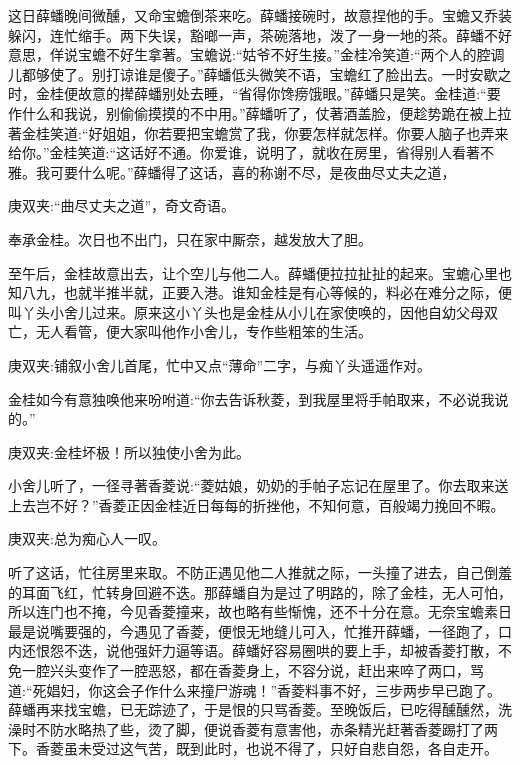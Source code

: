 \begin{parag}
    这日薛蟠晚间微醺，又命宝蟾倒茶来吃。薛蟠接碗时，故意捏他的手。宝蟾又乔装躲闪，连忙缩手。两下失误，豁啷一声，茶碗落地，泼了一身一地的茶。薛蟠不好意思，佯说宝蟾不好生拿著。宝蟾说:“姑爷不好生接。”金桂冷笑道:“两个人的腔调儿都够使了。别打谅谁是傻子。”薛蟠低头微笑不语，宝蟾红了脸出去。一时安歇之时，金桂便故意的撵薛蟠别处去睡，“省得你馋痨饿眼。”薛蟠只是笑。金桂道:“要作什么和我说，别偷偷摸摸的不中用。”薛蟠听了，仗著酒盖脸，便趁势跪在被上拉著金桂笑道:“好姐姐，你若要把宝蟾赏了我，你要怎样就怎样。你要人脑子也弄来给你。”金桂笑道:“这话好不通。你爱谁，说明了，就收在房里，省得别人看著不雅。我可要什么呢。”薛蟠得了这话，喜的称谢不尽，是夜曲尽丈夫之道，\begin{note}庚双夹:“曲尽丈夫之道”，奇文奇语。\end{note}奉承金桂。次日也不出门，只在家中厮奈，越发放大了胆。
\end{parag}


\begin{parag}
    至午后，金桂故意出去，让个空儿与他二人。薛蟠便拉拉扯扯的起来。宝蟾心里也知八九，也就半推半就，正要入港。谁知金桂是有心等候的，料必在难分之际，便叫丫头小舍儿过来。原来这小丫头也是金桂从小儿在家使唤的，因他自幼父母双亡，无人看管，便大家叫他作小舍儿，专作些粗笨的生活。\begin{note}庚双夹:铺叙小舍儿首尾，忙中又点“薄命”二字，与痴丫头遥遥作对。\end{note}金桂如今有意独唤他来吩咐道:“你去告诉秋菱，到我屋里将手帕取来，不必说我说的。”\begin{note}庚双夹:金桂坏极！所以独使小舍为此。\end{note}小舍儿听了，一径寻著香菱说:“菱姑娘，奶奶的手帕子忘记在屋里了。你去取来送上去岂不好？”香菱正因金桂近日每每的折挫他，不知何意，百般竭力挽回不暇。\begin{note}庚双夹:总为痴心人一叹。\end{note}听了这话，忙往房里来取。不防正遇见他二人推就之际，一头撞了进去，自己倒羞的耳面飞红，忙转身回避不迭。那薛蟠自为是过了明路的，除了金桂，无人可怕，所以连门也不掩，今见香菱撞来，故也略有些惭愧，还不十分在意。无奈宝蟾素日最是说嘴要强的，今遇见了香菱，便恨无地缝儿可入，忙推开薛蟠，一径跑了，口内还恨怨不迭，说他强奸力逼等语。薛蟠好容易圈哄的要上手，却被香菱打散，不免一腔兴头变作了一腔恶怒，都在香菱身上，不容分说，赶出来啐了两口，骂道:“死娼妇，你这会子作什么来撞尸游魂！”香菱料事不好，三步两步早已跑了。薛蟠再来找宝蟾，已无踪迹了，于是恨的只骂香菱。至晚饭后，已吃得醺醺然，洗澡时不防水略热了些，烫了脚，便说香菱有意害他，赤条精光赶著香菱踢打了两下。香菱虽未受过这气苦，既到此时，也说不得了，只好自悲自怨，各自走开。
\end{parag}


